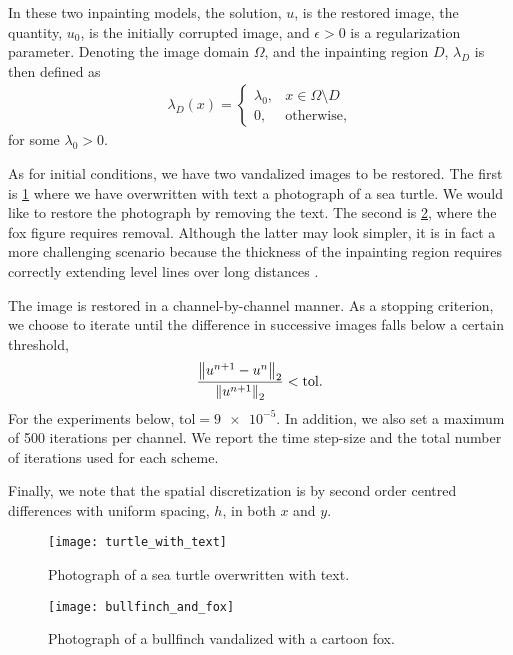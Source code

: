 In these two inpainting models, the solution, $u$, is the restored image, the quantity, $u_0$, is the initially corrupted image, and $\epsilon > 0$ is a regularization parameter. Denoting the image domain $\Omega$, and the inpainting region $D$, $\lambda_D$ is then defined as 
\begin{align}
\lambda_D(x)
= \begin{cases}
\lambda_0, & x\in \Omega\setminus D
\\
0, &\text{otherwise},
\end{cases}
\end{align}
for some $\lambda_0 > 0$.

As for initial conditions, we have two vandalized images to be restored. The first is \cref{fig:turtle with text} where we have overwritten with text a photograph of a sea turtle. We would like to restore the photograph by removing the text. The second is \cref{fig:bullfinch and fox}, where the fox figure requires removal. Although the latter may look simpler, it is in fact a more challenging scenario because the thickness of the inpainting region requires correctly extending level lines over long distances \cite{schonlieb2011unconditionally}.

The image is restored in a channel-by-channel manner. As a stopping criterion, we choose to iterate until the difference in successive images falls below a certain threshold, 
\begin{align}
        \frac{\left\lVert u^{n+1} - u^n\right\rVert_2}{\left\lVert u^{n+1}\right\rVert_2} < \mathrm{tol}.
\end{align}
For the experiments below, $\mathrm{tol}=\num{9e-5}$.  In addition, we also set a maximum of 500 iterations per channel. We report the time step-size and the total number of iterations used for each scheme.

Finally, we note that the spatial discretization is by second order centred differences with uniform spacing, $h$, in both $x$ and $y$.
\begin{figure}[htb!]
        \centering 
\texttt{[image: turtle\_with\_text]}
\caption[Photograph of a sea turtle overwritten with text]{Photograph of a sea turtle overwritten with text.}
\label{fig:turtle with text}
\end{figure}

\begin{figure}[htb!]
        \centering 
\texttt{[image: bullfinch\_and\_fox]}
\caption[Photograph of a bullfinch vandalized by a cartoonish fox]{Photograph of a bullfinch vandalized with a cartoon fox.}
\label{fig:bullfinch and fox}
\end{figure}

